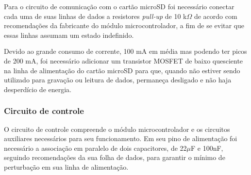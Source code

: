 Para o circuito de comunicação com o cartão microSD foi necessário conectar cada uma de suas linhas de dados a resistores \textit{pull-up} de 10 k$\Omega$ de acordo com recomendações da fabricante do módulo microcontrolador, a fim de se evitar que essas linhas assumam um estado indefinido. 

Devido ao grande consumo de corrente, 100 mA em média mas podendo ter picos de 200 mA, foi necessário adicionar um transistor MOSFET de baixo quesciente na linha de alimentação do cartão microSD para que, quando não estiver sendo utilizado para gravação ou leitura de dados, permaneça desligado e não haja desperdício de energia.

    \begin{figure}[h!]
            \captionsetup{width=7cm}
   \end{figure}  



\subsubsection{Circuito de controle}


O circuito de controle compreende o módulo microcontrolador e os circuitos auxiliares necessários para seu funcionamento. Em seu pino de alimentação foi necessário a associação em paralelo de dois capacitores, de 22$\mu$F e 100nF, seguindo recomendações da sua folha de dados, para garantir o mínimo de perturbação em sua linha de alimentação. 

